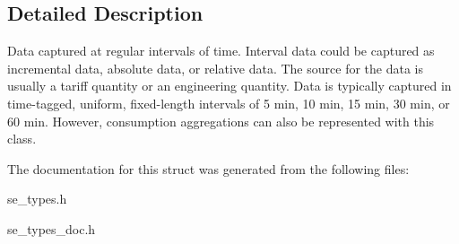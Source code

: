 \subsection{Detailed Description}
Data captured at regular intervals of time. Interval data could be captured as incremental data, absolute data, or relative data. The source for the data is usually a tariff quantity or an engineering quantity. Data is typically captured in time-\/tagged, uniform, fixed-\/length intervals of 5 min, 10 min, 15 min, 30 min, or 60 min. However, consumption aggregations can also be represented with this class. 

The documentation for this struct was generated from the following files\+:\begin{DoxyCompactItemize}
\item 
se\+\_\+types.\+h\item 
se\+\_\+types\+\_\+doc.\+h\end{DoxyCompactItemize}
